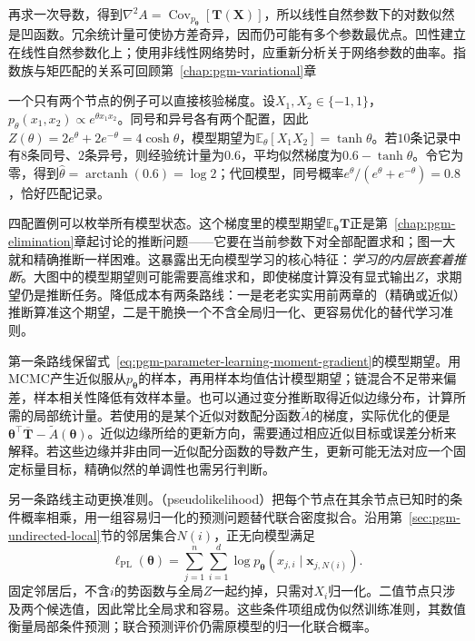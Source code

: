 再求一次导数，得到$\nabla^2A=\operatorname{Cov}_{p_{\bm{\theta}}}[\bm{T}(\bm{X})]$，所以线性自然参数下的对数似然是凹函数。冗余统计量可使协方差奇异，因而仍可能有多个参数最优点。凹性建立在线性自然参数化上；使用非线性网络势时，应重新分析关于网络参数的曲率。指数族与矩匹配的关系可回顾第~\ref{chap:pgm-variational}章

一个只有两个节点的例子可以直接核验梯度。设$X_1,X_2\in\{-1,1\}$，$p_\theta(x_1,x_2)\propto e^{\theta x_1x_2}$。同号和异号各有两个配置，因此$Z(\theta)=2e^\theta+2e^{-\theta}=4\cosh\theta$，模型期望为$\mathbb{E}_\theta[X_1X_2]=\tanh\theta$。若$10$条记录中有$8$条同号、$2$条异号，则经验统计量为$0.6$，平均似然梯度为$0.6-\tanh\theta$。令它为零，得到$\widehat\theta=\operatorname{arctanh}(0.6)=\log2$；代回模型，同号概率$e^\theta/(e^\theta+e^{-\theta})=0.8$，恰好匹配记录。

四配置例可以枚举所有模型状态。这个梯度里的模型期望$\mathbb E_{\bm\theta}\bm T$正是第~\ref{chap:pgm-elimination}章起讨论的推断问题——它要在当前参数下对全部配置求和；图一大就和精确推断一样困难。这暴露出无向模型学习的核心特征：\emph{学习的内层嵌套着推断}。大图中的模型期望则可能需要高维求和，即使梯度计算没有显式输出$Z$，求期望仍是推断任务。降低成本有两条路线：一是老老实实用前两章的（精确或近似）推断算准这个期望，二是干脆换一个不含全局归一化、更容易优化的替代学习准则。

第一条路线保留式~\eqref{eq:pgm-parameter-learning-moment-gradient}的模型期望。用MCMC产生近似服从$p_{\bm{\theta}}$的样本，再用样本均值估计模型期望；链混合不足带来偏差，样本相关性降低有效样本量。也可以通过变分推断取得近似边缘分布，计算所需的局部统计量。若使用的是某个近似对数配分函数$\widetilde A$的梯度，实际优化的便是$\bm{\theta}^\top\overline{\bm{T}}-\widetilde A(\bm{\theta})$。近似边缘所给的更新方向，需要通过相应近似目标或误差分析来解释。若这些边缘并非由同一近似配分函数的导数产生，更新可能无法对应一个固定标量目标，精确似然的单调性也需另行判断。

另一条路线主动更换准则。（pseudolikelihood）把每个节点在其余节点已知时的条件概率相乘，用一组容易归一化的预测问题替代联合密度拟合。沿用第~\ref{sec:pgm-undirected-local}节的邻居集合$N(i)$，正无向模型满足
\begin{equation}
  \ell_{\mathrm{PL}}(\bm{\theta})
  =\sum_{j=1}^n\sum_{i=1}^d
    \log p_{\bm{\theta}}
      (x_{j,i}\mid\bm{x}_{j,N(i)}).
  \label{eq:pgm-parameter-learning-pseudolikelihood}
\end{equation}
固定邻居后，不含$i$的势函数与全局$Z$一起约掉，只需对$X_i$归一化。二值节点只涉及两个候选值，因此常比全局求和容易。这些条件项组成伪似然训练准则，其数值衡量局部条件预测；联合预测评价仍需原模型的归一化联合概率。


